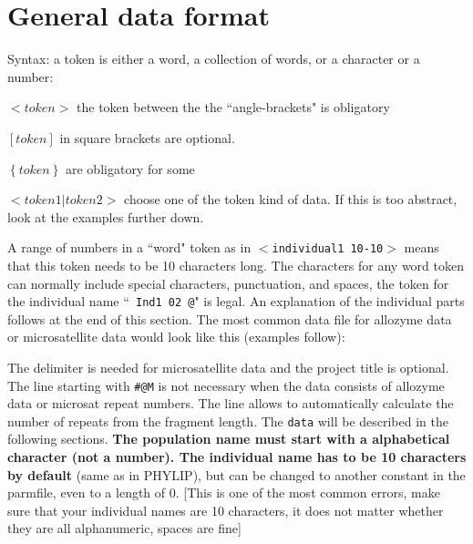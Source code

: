 \section*{General data format}
Syntax: a token is either a word, a collection of words, or a character or a number:
\begin{description}
\item{$<token>$} the token between the the ``angle-brackets" is obligatory
\item{$\left[token\right]$} in square brackets are optional.
\item{$\left\{token\right\}$} are obligatory for some 
\item{$<token1 | token2>$} choose one of the token kind of data.
If this is too abstract, look at the examples further down.
\end{description}
A range of numbers in a ``word" token as in $<${\texttt {individual1 10-10}}$>$
means that this token needs to be 10 characters long. The characters for
any word token can normally include special characters, punctuation, and spaces, the token for the individual name ``{\texttt{ Ind1  02 @}}" is legal. An explanation of the individual parts follows at the end of this section.
The most common data file for allozyme data or microsatellite data
would look like this (examples follow):
\smallskip
\begin{small}
\end{small}
The delimiter is needed for microsatellite data and the project title is optional.  The line starting with \texttt{\#@M}  is not necessary when the data consists of allozyme data or microsat repeat numbers. The line allows to automatically calculate the number of repeats from the fragment length.   The \texttt{data}
will be described in the following sections. \textbf{The population name must start with a alphabetical character (not a number). The individual name has to be  10 characters by default} (same as in PHYLIP), but can be changed to another constant in the parmfile, even to a length of 0.
[This is one of the most common errors, make sure that your individual names are 10 characters, it does not matter whether they are all alphanumeric, spaces are fine]
